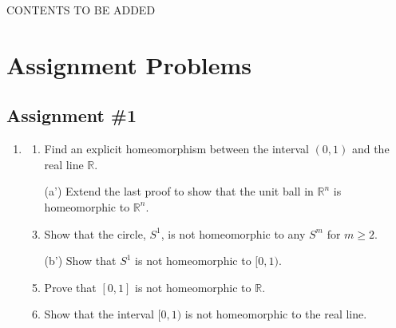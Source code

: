 \documentclass[notoc,notitlepage]{tufte-book}
\begin{document}
CONTENTS TO BE ADDED %


\chapter{Assignment Problems}%
\label{chp:assignment_problems}

\section{Assignment \#1}%
\label{sec:assignment_1}

\begin{enumerate}
  \item 
    \begin{enumerate}
      \item Find an explicit homeomorphism between the interval $(0, 1)$ and the real line
        $\mathbb{R}$.
      \item[(a')] Extend the last proof to show that the unit ball in $\mathbb{R}^n$ is
        homeomorphic to $\mathbb{R}^n$.
      \item Show that the circle, $S^1$, is not homeomorphic to any $S^m$ for
        $m \geq 2$.
      \item[(b')] Show that $S^1$ is not homeomorphic to $[0, 1)$.
      \item Prove that $[0, 1]$ is not homeomorphic to $\mathbb{R}$.
      \item Show that the interval $[0, 1)$ is not homeomorphic to the real line.
    \end{enumerate}


\end{enumerate}
\end{document}
